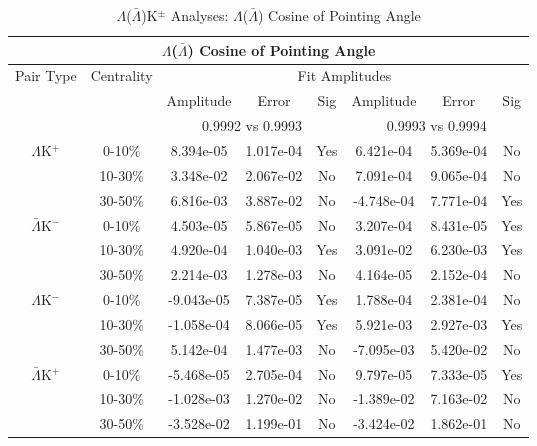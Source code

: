 \documentclass[../AnalysisNoteJBuxton.tex]{subfiles}
\begin{document}
\clearpage


\begin{table}
 \centering
 \begin{tabular}{|c|c|c|c|c||c|c|c|}
  \multicolumn{8}{c}{$\Lambda$($\bar{\Lambda}$) Cosine of Pointing Angle} \\
  \hline
  \multirow{3}{*}{Pair Type} & \multirow{3}{*}{Centrality} & \multicolumn{6}{c|}{Fit Amplitudes} \\
  \cline{3-8}
   & & Amplitude & Error & Sig & Amplitude & Error & Sig \\  
  \cline{3-8}
   & & \multicolumn{3}{c||}{0.9992 vs 0.9993} & \multicolumn{3}{c|}{0.9993 vs 0.9994} \\  
  \hline
  \multirow{3}{*}{$\Lambda$K$^{+}$}
   &  0-10\% & 8.394e-05 & 1.017e-04 & Yes & 6.421e-04 & 5.369e-04 & No \\
   & 10-30\% & 3.348e-02 & 2.067e-02 & No & 7.091e-04 & 9.065e-04 & No \\
   & 30-50\% & 6.816e-03 & 3.887e-02 & No & -4.748e-04 & 7.771e-04 & Yes \\
  \hline
  \multirow{3}{*}{$\bar{\Lambda}$K$^{-}$}
   &  0-10\% & 4.503e-05 & 5.867e-05 & No & 3.207e-04 & 8.431e-05 & Yes \\
   & 10-30\% & 4.920e-04 & 1.040e-03 & Yes & 3.091e-02 & 6.230e-03 & Yes \\
   & 30-50\% & 2.214e-03 & 1.278e-03 & No & 4.164e-05 & 2.152e-04 & No \\
  \hline \hline
  \multirow{3}{*}{$\Lambda$K$^{-}$}
   &  0-10\% & -9.043e-05 & 7.387e-05 & Yes & 1.788e-04 & 2.381e-04 & No \\
   & 10-30\% & -1.058e-04 & 8.066e-05 & Yes & 5.921e-03 & 2.927e-03 & Yes \\
   & 30-50\% & 5.142e-04 & 1.477e-03 & No & -7.095e-03 & 5.420e-02 & No \\
  \hline
  \multirow{3}{*}{$\bar{\Lambda}$K$^{+}$}
   &  0-10\% & -5.468e-05 & 2.705e-04 & No & 9.797e-05 & 7.333e-05 & Yes \\
   & 10-30\% & -1.028e-03 & 1.270e-02 & No & -1.389e-02 & 7.163e-02 & No \\
   & 30-50\% & -3.528e-02 & 1.199e-01 & No & -3.424e-02 & 1.862e-01 & No \\
  \hline
 \end{tabular}
 \caption{$\Lambda$($\bar{\Lambda}$)K$^{\pm}$ Analyses: $\Lambda$($\bar{\Lambda}$) Cosine of Pointing Angle}
 \label{tab:LamCosPointingAngleLamKch}
\end{table}
\end{document}

